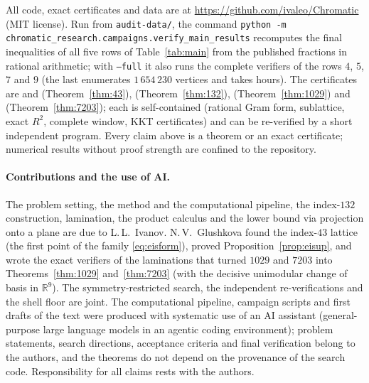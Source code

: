 \documentclass[10pt]{article}
\theoremstyle{plain}
\theoremstyle{remark}
\newcommand{\R}{\mathbb{R}}
\begin{document}
All code, exact certificates and data are at
\url{https://github.com/ivaleo/Chromatic} (MIT license). Run from
\texttt{audit-data/}, the command
\texttt{python -m chromatic\_research.campaigns.verify\_main\_results}
recomputes the final inequalities of all five rows of Table~\ref{tab:main}
from the published fractions in rational arithmetic; with \texttt{--full} it
also runs the complete verifiers of the rows $4$, $5$, $7$ and $9$ (the last
enumerates $1\,654\,230$ vertices and takes hours). The certificates are
 and
 (Theorem~\ref{thm:43}),
(Theorem~\ref{thm:132}), 
(Theorem~\ref{thm:1029}) and 
(Theorem~\ref{thm:7203}); each is self-contained (rational Gram form,
sublattice, exact $R^2$, complete window, KKT certificates) and can be
re-verified by a short independent program. Every claim above is a theorem
or an exact certificate; numerical results without proof strength are
confined to the repository.

\paragraph{Contributions and the use of AI.}
The problem setting, the method and the computational pipeline, the
index-$132$ construction, lamination, the product calculus and the lower
bound via projection onto a plane are due to L.\,L.~Ivanov. N.\,V.~Glushkova found the index-$43$
lattice (the first point of the family \eqref{eq:eisform}), proved
Proposition~\ref{prop:eisup}, and wrote the exact verifiers of the
laminations that turned $1029$ and $7203$ into
Theorems~\ref{thm:1029} and~\ref{thm:7203} (with the decisive unimodular
change of basis in $\R^9$). The symmetry-restricted search, the independent
re-verifications and the shell floor are joint. The computational pipeline,
campaign scripts and first drafts of the text were produced with systematic
use of an AI assistant (general-purpose large language models in an agentic
coding environment); problem statements, search directions, acceptance
criteria and final verification belong to the authors, and the theorems do
not depend on the provenance of the search code. Responsibility for all
claims rests with the authors.
\end{document}
